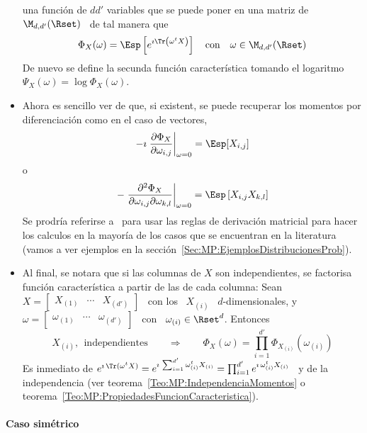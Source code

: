 \begin{itemize}
  una  funci\'on de  $d d'$  variables que  se puede  poner en  una matriz  de \
  $\M_{d,d'}(\Rset)$ \ de tal manera que
  \[
  \Phi_X(\omega) =  \Esp\left[ e^{\imath  \Tr\left( \omega^t X  \right)} \right]
  \quad \mbox{con} \quad \omega \in \M_{d,d'}(\Rset)
  \]
  De nuevo  se define la  secunda funci\'on caracter\'istica tomando  el logaritmo
  $\Psi_X(\omega) = \log \Phi_X(\omega)$.
%
\item Ahora es sencillo ver de que, si existent, se puede recuperar los momentos
  por  diferenciaci\'on   como  en  el  caso  de   vectores,
  \[
  -\imath \left. \frac{\partial \Phi_X}{\partial \omega_{i,j}} \right|_{\omega =
    0} = \Esp[X_{i,j}]
  \]
  o
  \[
  - \left. \frac{\partial^2 \Phi_X}{\partial \omega_{i,j} \partial \omega_{k,l}}
  \right|_{\omega = 0} = \Esp\left[ X_{i,j} X_{k,l} \right]
  \]
  Se  prodr\'ia  referirse a~\cite[Cap.~8]{MagNeu99}  para  usar  las reglas  de
  derivaci\'on matricial  para hacer los calculos  en la mayor\'ia  de los casos
  que   se  encuentran  en   la  literatura   (vamos  a   ver  ejemplos   en  la
  secci\'on~\ref{Sec:MP:EjemplosDistribucionesProb}).
%
\item Al  final, se  notara que si  las columnas  de $X$ son  independientes, se
  factorisa funci\'on caracter\'istica  a partir de las de  cada columna: Sean \
  $X =  \begin{bmatrix} X_{(1)} & \cdots  & X_{(d')} \end{bmatrix}$ \  con los \
  $X_{(i)}$ \  $d$-dimensionales, y \  $\omega = \begin{bmatrix}  \omega_{(1)} &
    \cdots   &  \omega_{(d')}   \end{bmatrix}$   \  con   \  $\omega_{(i)}   \in
  \Rset^d$. Entonces
    \[
    X_{(i)}, \:\: \mbox{independientes} \qquad \Rightarrow \qquad \Phi_X(\omega)
    = \prod_{i=1}^{d'} \Phi_{X_{(i)}}(\omega_{(i)})
  \]
  Es inmediato de $e^{\imath \,  \Tr(\omega^t X)} = e^{\imath \, \sum_{i=1}^{d'}
    \omega_{(i)}^t  X_{(i)}}  =  \prod_{i=1}^{d'}  e^{\imath  \,  \omega_{(i)}^t
    X_{(i)}}$       \        y       de       la        independencia       (ver
  teorema~\ref{Teo:MP:IndependenciaMomentos}                                    o
  teorema~\ref{Teo:MP:PropiedadesFuncionCaracteristica}).
%
\end{itemize}




\paragraph{Caso sim\'etrico}

